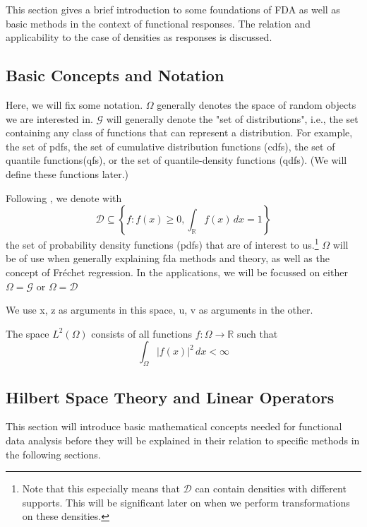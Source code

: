 This section gives a brief introduction to some foundations of FDA as well as basic
methods in the context of functional responses. The relation and applicability to the
case of densities as responses is discussed.

\subsection{Basic Concepts and Notation}
\label{sec:basics}
Here, we will fix some notation. $\Omega$ generally denotes the space of random objects
we are interested in. $\mathcal{G}$ will generally denote the "set of distributions", i.e., the set containing
any class of functions that can represent a distribution. For example, the set of pdfs,
the set of cumulative distribution functions (cdfs), the set of quantile functions(qfs),
or the set of quantile-density functions (qdfs). (We will define these functions later.)

Following \textcite{PetersenZhangKokoszka2022}, we denote with
\begin{equation*}
    \mathcal{D} \subseteq \left\{ f : f(x) \geq 0, \int_{\mathbb{R}} f(x) \, dx = 1 \right\}
\end{equation*}
the set of probability density functions (pdfs) that are of interest to us.\footnote{Note that
this especially means that $\mathcal{D}$ can contain densities with different supports.
This will be significant later on when we perform transformations on these densities.}
$\Omega$ will be of use when generally explaining fda methods and theory, as well as
the concept of Fréchet regression. In the applications, we will be focussed on either
$\Omega = \mathcal{G}$ or $\Omega = \mathcal{D}$

We use x, z as arguments in this space, u, v as arguments in the other.



\begin{definition}[$L^2$]
    The space \( L^2(\Omega) \) consists of all functions \( f: \Omega \to \mathbb{R} \) such that
    \[
    \int_{\Omega} |f(x)|^2 \, dx < \infty
    \]
\end{definition}

\subsection{Hilbert Space Theory and Linear Operators}
\label{sec:hilbert spaces}
This section will introduce basic mathematical concepts needed for functional data
analysis before they will be explained in their relation to specific methods in the
following sections.

